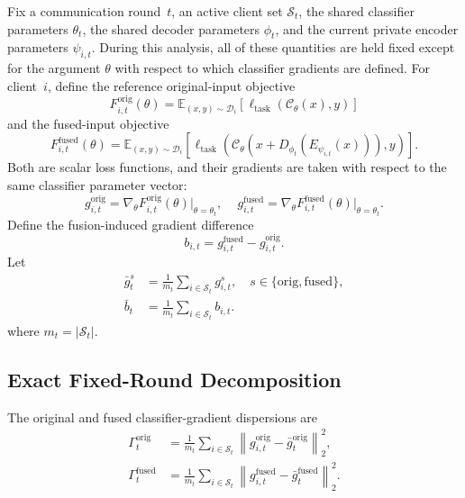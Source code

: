 \documentclass[twoside]{article}
\theoremstyle{thmstyleone}%
\theoremstyle{thmstyletwo}%
\theoremstyle{thmstylethree}%
\begin{document}
Fix a communication round~$t$, an active client set $\mathcal{S}_t$, the shared
classifier parameters $\theta_t$, the shared decoder parameters $\phi_t$, and
the current private encoder parameters $\psi_{i,t}$. During this analysis, all
of these quantities are held fixed except for the argument $\theta$ with
respect to which classifier gradients are defined.
For client~$i$, define the reference original-input objective
\begin{equation*}
F_{i,t}^{\mathrm{orig}}(\theta)
=
\mathbb{E}_{(x,y)\sim\mathcal{D}_i}
\left[
\ell_{\mathrm{task}}
\left(
\mathcal{C}_{\theta}(x),y
\right)
\right]
\end{equation*}
and the fused-input objective
\begin{equation*}
F_{i,t}^{\mathrm{fused}}(\theta)
=
\mathbb{E}_{(x,y)\sim\mathcal{D}_i}
\left[
\ell_{\mathrm{task}}
\left(
\mathcal{C}_{\theta}
\left(
x+D_{\phi_t}\!\left(E_{\psi_{i,t}}(x)\right)
\right),
y
\right)
\right].
\end{equation*}
Both are scalar loss functions, and their gradients are taken with respect to
the same classifier parameter vector:
\begin{equation*}
g_{i,t}^{\mathrm{orig}}
=
\nabla_{\theta}F_{i,t}^{\mathrm{orig}}(\theta)
\big|_{\theta=\theta_t}, \,\,\,\,\,\,\,
g_{i,t}^{\mathrm{fused}}
=
\nabla_{\theta}F_{i,t}^{\mathrm{fused}}(\theta)
\big|_{\theta=\theta_t}.
\end{equation*}
Define the fusion-induced gradient difference
\begin{equation*}
b_{i,t}
=
g_{i,t}^{\mathrm{fused}}
-
g_{i,t}^{\mathrm{orig}}.
\end{equation*}
Let
\begin{equation*}
\begin{aligned}
\bar{g}_t^{s}
&= \frac{1}{m_t}
   \sum_{i\in\mathcal{S}_t} g_{i,t}^{s},
   \quad s\in\{\mathrm{orig},\mathrm{fused}\},\\
\bar{b}_t
&= \frac{1}{m_t}
   \sum_{i\in\mathcal{S}_t} b_{i,t}.
\end{aligned}
\end{equation*}
where $m_t=|\mathcal{S}_t|$.

\subsection{Exact Fixed-Round Decomposition}

The original and fused classifier-gradient dispersions are
\begin{align*}
\Gamma_t^{\mathrm{orig}}
&=
\frac{1}{m_t}
\sum_{i\in\mathcal{S}_t}
\left\|
g_{i,t}^{\mathrm{orig}}
-
\bar{g}_t^{\mathrm{orig}}
\right\|_2^2,\\
\Gamma_t^{\mathrm{fused}}
&=
\frac{1}{m_t}
\sum_{i\in\mathcal{S}_t}
\left\|
g_{i,t}^{\mathrm{fused}}
-
\bar{g}_t^{\mathrm{fused}}
\right\|_2^2.
\end{align*}
\end{document}
